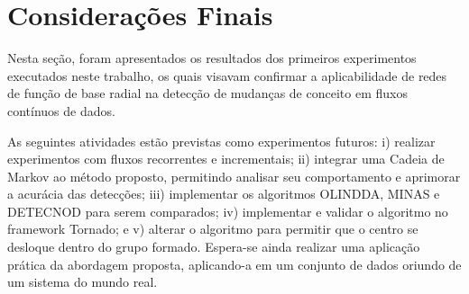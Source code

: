 \documentclass[qual, classic, a4paper]{ufbathesis}
\begin{document}
\section{Considerações Finais}

Nesta seção, foram apresentados os resultados dos primeiros experimentos executados neste trabalho, 
os quais visavam confirmar a aplicabilidade de redes de função de base radial na detecção de mudanças de conceito em fluxos contínuos de dados.

As seguintes atividades estão previstas como experimentos futuros: 
i) realizar experimentos com fluxos recorrentes e incrementais;
ii) integrar uma Cadeia de Markov ao método proposto, permitindo analisar seu comportamento e aprimorar a acurácia das detecções;
iii) implementar os algoritmos OLINDDA, MINAS e DETECNOD para serem comparados; 
iv) implementar e validar o algoritmo no framework Tornado; e
v) alterar o algoritmo para permitir que o centro se desloque dentro do grupo formado.
Espera-se ainda realizar uma aplicação prática da abordagem proposta, aplicando-a em um conjunto de dados oriundo de um sistema do mundo real.

\backmatter





%
% 
% 

\end{document}
